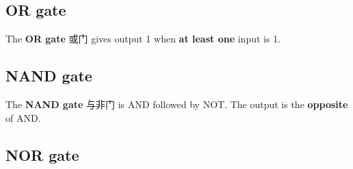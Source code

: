 \documentclass[11pt]{article}
\begin{document}
\begin{center}
\end{center}

\subsection*{OR gate}

The \textbf{OR gate} 或门 gives output 1 when \textbf{at least one} input is 1.

\begin{center}
\end{center}

\subsection*{NAND gate}

The \textbf{NAND gate} 与非门 is AND followed by NOT. The output is the \textbf{opposite} of AND.

\begin{center}
\end{center}

\subsection*{NOR gate}
\end{document}
